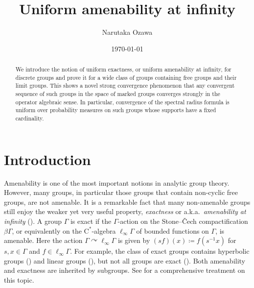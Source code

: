 \documentclass[12pt,nosumlimits,nonamelimits]{amsart}
\title{Uniform amenability at infinity}
\author{Narutaka Ozawa}
\date{\today}
\theoremstyle{remark}
\theoremstyle{definition}
\newcommand{\rC}{\mathrm{C}}
\newcommand{\Ga}{\Gamma}
\newcommand{\acts}{\curvearrowright}
\newcommand{\cst}{$\rC^*$-alge\-bra}
\begin{document}
\begin{abstract}
We introduce the notion of uniform exactness, or 
uniform amenability at infinity, for discrete groups and 
prove it for a wide class of groups containing free groups 
and their limit groups. 
This shows a novel strong convergence phenomenon 
that any convergent sequence of such groups 
in the space of marked groups converges strongly 
in the operator algebraic sense. In particular, 
convergence of the spectral radius formula 
is uniform over probability measures on such groups 
whose supports have a fixed cardinality.
\end{abstract}
%
\maketitle
%
\section{Introduction}
%
Amenability is one of the most important notions in analytic group theory. 
However, many groups, in particular those groups that contain non-cyclic free groups, 
are not amenable. 
It is a remarkable fact that many non-amenable groups still enjoy 
the weaker yet very useful property, 
\emph{exactness} or a.k.a.\ \emph{amenability at infinity} 
(\cite{anantharaman-delaroche, kw}). 
A group $\Ga$ is exact if the $\Ga$-action 
on the Stone--\v{C}ech compactification $\beta\Ga$, or equivalently 
on the \cst{} $\ell_\infty\Ga$ of bounded functions on $\Ga$, 
is amenable. 
Here the action $\Ga\acts\ell_\infty\Ga$ is given by 
$(sf)(x) \coloneq f(s^{-1}x)$ for $s,x\in\Ga$ and $f\in\ell_\infty\Ga$. 
For example, the class of exact groups contains 
hyperbolic groups (\cite{adams}) 
and linear groups (\cite{ghw}), 
but not all groups are exact (\cite{ad,gromov,osajda}). 
Both amenability and exactness are inherited by subgroups. 
See \cite{adr, bo} for a comprehensive treatment on 
this topic. 
\end{document}
